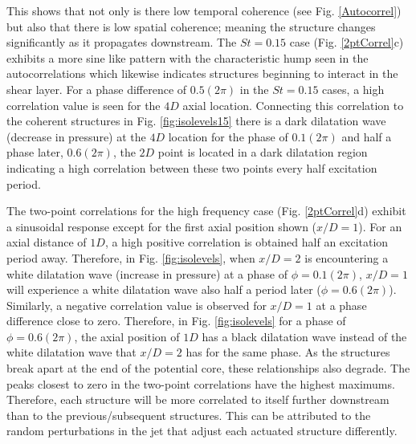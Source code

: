 \documentclass[english]{aiaa-tc}
\begin{document}
This shows that not only is there low temporal coherence (see Fig. \ref{Autocorrel}) but also that there is low spatial coherence; meaning the structure changes significantly as it propagates downstream.
The $St=0.15$ case (Fig. \ref{2ptCorrel}c) exhibits a more sine like pattern with the characteristic hump seen in the autocorrelations which likewise indicates structures beginning to interact in the shear layer.
For a phase difference of $0.5(2\pi)$ in the $St=0.15$ cases, a high correlation value is seen for the $4D$ axial location. Connecting this correlation to the coherent structures in Fig. \ref{fig:isolevels15} there is a dark dilatation wave (decrease in pressure) at the $4D$ location for the phase of $0.1(2\pi)$ and half a phase later, $0.6(2\pi)$, the $2D$ point is located in a dark dilatation region indicating a high correlation between these two points every half excitation period.

The two-point correlations for the high frequency case (Fig. \ref{2ptCorrel}d) exhibit a sinusoidal response except for the first axial position shown ($x/D=1$). For an axial distance of $1D$, a high positive correlation is obtained half an excitation period away.
Therefore, in Fig. \ref{fig:isolevels}, when $x/D=2$ is encountering a white dilatation wave (increase in pressure) at a phase of $\phi=0.1(2\pi)$, $x/D=1$ will experience a white dilatation wave also half a period later ($\phi=0.6(2\pi)$). Similarly, a negative correlation value is observed for $x/D=1$ at a phase difference close to zero. Therefore, in Fig. \ref{fig:isolevels} for a phase of $\phi=0.6(2\pi)$, the axial position of $1D$ has a black dilatation wave instead of the white dilatation wave that $x/D=2$ has for the same phase. As the structures break apart at the end of the potential core, these relationships also degrade.
The peaks closest to zero in the two-point correlations have the highest maximums. Therefore, each structure will be more correlated to itself further downstream than to the previous/subsequent structures. This can be attributed to the random perturbations in the jet that adjust each actuated structure differently.
\end{document}
